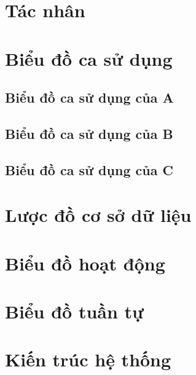 \section{Tác nhân}
\section{Biểu đồ ca sử dụng}
\subsection{Biểu đồ ca sử dụng của A}
\subsection{Biểu đồ ca sử dụng của B}
\subsection{Biểu đồ ca sử dụng của C}
\section{Lược đồ cơ sở dữ liệu}
\section{Biểu đồ hoạt động}
\section{Biểu đồ tuần tự}
\section{Kiến trúc hệ thống}